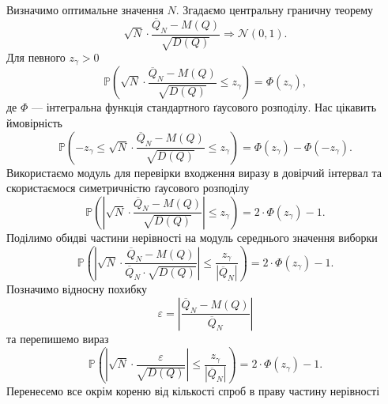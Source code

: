 Визначимо оптимальне значення $N$.
Згадаємо центральну граничну теорему
\begin{equation*}
  \sqrt{N}
    \cdot \frac{\overline{Q}_N - M\left( Q \right)}
    {\sqrt{D\left( Q \right)}} \Rightarrow \mathcal{N}\left( 0, 1 \right).
\end{equation*}
Для певного $z_{\gamma} > 0$
\begin{equation*}
  \mathbb{P}\left(
    \sqrt{N}
    \cdot \frac{\overline{Q}_N - M\left( Q \right)}{\sqrt{D\left( Q \right)}}
    \le z_{\gamma}
  \right) = \Phi\left( z_{\gamma} \right),
\end{equation*}
де $\Phi$ --- інтегральна функція стандартного ґаусового розподілу.
Нас цікавить ймовірність
\begin{equation*}
  \mathbb{P}\left(
    -z_{\gamma} \le
    \sqrt{N}
    \cdot \frac{\overline{Q}_N - M\left( Q \right)}{\sqrt{D\left( Q \right)}}
    \le z_{\gamma}
  \right)
  = \Phi\left( z_{\gamma} \right) - \Phi\left( -z_{\gamma} \right).
\end{equation*}
Використаємо модуль для перевірки входження виразу в довірчий інтервал
та скористаємося симетричністю ґаусового розподілу
\begin{equation*}
  \mathbb{P}\left(
    \left|
      \sqrt{N}
      \cdot \frac{\overline{Q}_N - M\left( Q \right)}{\sqrt{D\left( Q \right)}}
    \right|
    \le z_{\gamma}
  \right)
  = 2 \cdot \Phi\left( z_{\gamma} \right) - 1.
\end{equation*}
Поділимо обидві частини нерівності на модуль середнього значення виборки
\begin{equation*}
  \mathbb{P}\left(
    \left|
      \sqrt{N}
      \cdot \frac{\overline{Q}_N - M\left( Q \right)}
        {\overline{Q}_N \cdot \sqrt{D\left( Q \right)}}
    \right|
    \le \frac{z_{\gamma}}{\left| \overline{Q}_N \right|}
  \right)
  = 2 \cdot \Phi\left( z_{\gamma} \right) - 1.
\end{equation*}
Позначимо відносну похибку
\begin{equation*}
  \varepsilon
  = \left| \frac{\overline{Q}_N - M\left( Q \right)}{\overline{Q}_N} \right|
\end{equation*}
та перепишемо вираз
\begin{equation*}
  \mathbb{P}\left(
    \left|
      \sqrt{N}
      \cdot \frac{\varepsilon}
        {\sqrt{D\left( Q \right)}}
    \right|
    \le \frac{z_{\gamma}}{\left| \overline{Q}_N \right|}
  \right)
  = 2 \cdot \Phi\left( z_{\gamma} \right) - 1.
\end{equation*}
Перенесемо все окрім кореню від кількості спроб в праву частину нерівності
